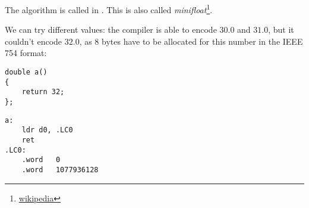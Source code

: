 The algorithm is called  in \ARMSixFourRefURL.
This is also called \emph{minifloat}\footnote{\href{http://go.yurichev.com/17139}{wikipedia}}.

We can try different values: the compiler is able to encode $30.0$ and $31.0$, but it couldn't encode $32.0$,
as 8 bytes have to be allocated for this number in the IEEE 754 format:

\begin{lstlisting}[style=customc]
double a()
{
	return 32;
};
\end{lstlisting}

\begin{lstlisting}[caption=GCC 4.9.1 -O3,style=customasmARM]
a:
	ldr	d0, .LC0
	ret
.LC0:
	.word	0
	.word	1077936128
\end{lstlisting}
